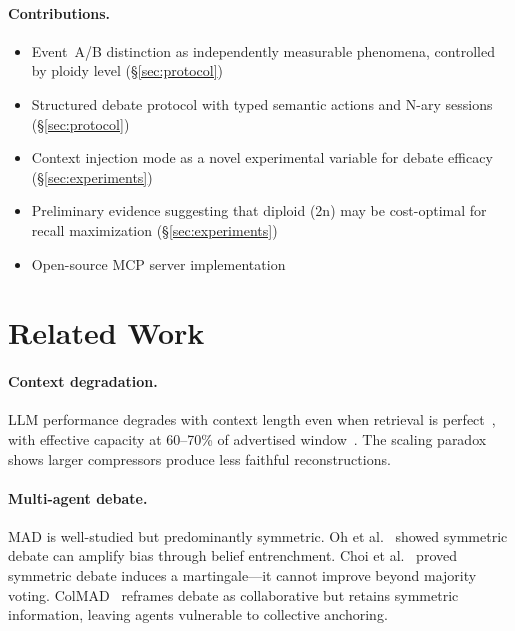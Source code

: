 \documentclass{article}
\begin{document}
\paragraph{Contributions.}
\begin{itemize}[leftmargin=1.5em, itemsep=1pt]
  \item Event~A/B distinction as independently measurable phenomena, controlled by ploidy level (\S\ref{sec:protocol})
  \item Structured debate protocol with typed semantic actions and N-ary sessions (\S\ref{sec:protocol})
  \item Context injection mode as a novel experimental variable for debate efficacy (\S\ref{sec:experiments})
  \item Preliminary evidence suggesting that diploid (2n) may be cost-optimal for recall maximization (\S\ref{sec:experiments})
  \item Open-source MCP server implementation
\end{itemize}

\section{Related Work}
\label{sec:related}

\paragraph{Context degradation.} LLM performance degrades with context length even when retrieval is perfect~\citep{du2025context}, with effective capacity at 60--70\% of advertised window~\citep{chroma2025contextrot}. The scaling paradox~\citep{scaling2026paradox} shows larger compressors produce less faithful reconstructions.

\paragraph{Multi-agent debate.} MAD is well-studied but predominantly symmetric. Oh et al.~\citep{oh2025dreamad} showed symmetric debate can amplify bias through belief entrenchment. Choi et al.~\citep{choi2025debate} proved symmetric debate induces a martingale---it cannot improve beyond majority voting. ColMAD~\citep{chen2025colmad} reframes debate as collaborative but retains symmetric information, leaving agents vulnerable to collective anchoring.
\end{document}
